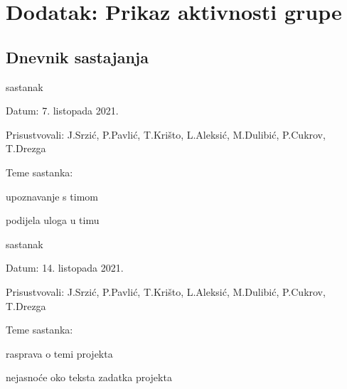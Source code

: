 \chapter*{Dodatak: Prikaz aktivnosti grupe}
		
		\section*{Dnevnik sastajanja}
		
%		
		
		\begin{packed_enum}
			\item  sastanak
			
			\item[] \begin{packed_item}
				\item Datum: 7. listopada 2021.
				\item Prisustvovali: J.Srzić, P.Pavlić, T.Krišto, L.Aleksić, M.Dulibić, P.Cukrov, T.Drezga
				\item Teme sastanka:
				\begin{packed_item}
					\item  upoznavanje s timom
					\item  podijela uloga u timu
				\end{packed_item}
			\end{packed_item}
			
			\item  sastanak
			\item[] \begin{packed_item}
				\item Datum: 14. listopada 2021.
				\item Prisustvovali: J.Srzić, P.Pavlić, T.Krišto, L.Aleksić, M.Dulibić, P.Cukrov, T.Drezga
				\item Teme sastanka:
				\begin{packed_item}
					\item  rasprava o temi projekta
					\item  nejasnoće oko teksta zadatka projekta
				\end{packed_item}
			\end{packed_item}
			

\end{packed_enum}
